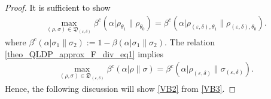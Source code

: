 \documentclass[onecolumn,ldraftcls, 11pt]{IEEEtran}
\newcommand{\eps}{\varepsilon}
\begin{document}
\begin{proof}
It is sufficient to show
\begin{align}
\max_{(\rho,\sigma) \in \mathfrak{D}_{(\eps,\delta)}} 
\beta^c(\alpha|\rho_{\theta_1}\|\rho_{\theta_0}) 
= \beta^c(\alpha| \rho_{(\eps,\delta),\theta_1}\|\rho_{(\eps,\delta),\theta_0})\label{VB2}.
\end{align}
where $\beta^c(\alpha| \sigma_1\|\sigma_2) :=1-\beta(\alpha| \sigma_1\|\sigma_2) $.
The relation \eqref{theo_QLDP_approx_F_div_eq1} implies
\begin{align}
\max_{(\rho,\sigma) \in \mathfrak{D}_{(\eps,\delta)}} 
\beta^c(\alpha| \rho\|\sigma) 
= \beta^c(\alpha| \rho_{(\eps,\delta)}\|\sigma_{(\eps,\delta)})
\label{VB3}.
\end{align}
Hence, the following discussion will show \eqref{VB2} from \eqref{VB3}.


\end{proof}
\end{document}
